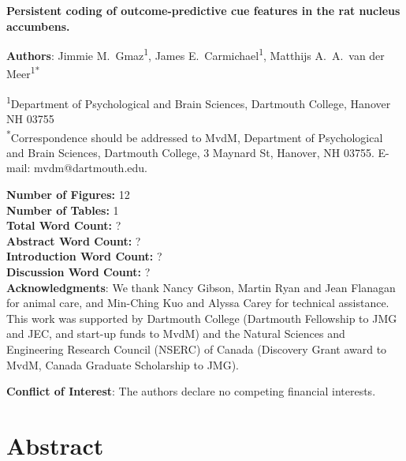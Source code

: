 \documentclass[11pt]{article}
\providecommand{\DIFadd}[1]{{\protect\color{blue}\uwave{#1}}} %
\providecommand{\DIFaddbegin}{} %
\providecommand{\DIFaddend}{} %
\newcommand{\DIFaddincludegraphics}[2][]{{\color{blue}\fbox{\DIFOincludegraphics[#1]{#2}}}} %
\DeclareRobustCommand{\DIFaddbegin}{\DIFOaddbegin \let\includegraphics\DIFaddincludegraphics} %
\DeclareRobustCommand{\DIFaddend}{\DIFOaddend \let\includegraphics\DIFOincludegraphics} %
\begin{document}
{\Large\bf Persistent coding of outcome-predictive cue features in the
  rat nucleus accumbens.}

{\bf Authors}: Jimmie M.\ Gmaz\textsuperscript{1}, James
E.\ Carmichael\textsuperscript{1}, Matthijs A.\ A.\ van der
Meer\textsuperscript{1*}

\textsuperscript{1}Department of Psychological and Brain Sciences,
Dartmouth College, Hanover NH
03755\\ 

\textsuperscript{*}Correspondence should be addressed to MvdM,
Department of Psychological and Brain Sciences, Dartmouth College, 3
Maynard St, Hanover, NH 03755. E-mail: {\sffamily mvdm@dartmouth.edu}.

\textbf{Number of Figures:} 12\\
\textbf{Number of Tables:} 1\\
\textbf{Total Word Count:} ?\\
\textbf{Abstract Word Count:} ?\\
\textbf{Introduction Word Count:} ?\\
\textbf{Discussion Word Count:} ?\\

\textbf{Acknowledgments}: We thank Nancy Gibson, Martin Ryan and Jean
Flanagan for animal care, and Min-Ching Kuo and
Alyssa Carey for technical assistance. This work was supported by
Dartmouth College (Dartmouth Fellowship to JMG and JEC, and start-up funds to
MvdM) and the Natural Sciences and Engineering Research Council
(NSERC) of Canada (Discovery Grant award to MvdM, Canada Graduate
Scholarship to JMG).

\textbf{Conflict of Interest}: The authors declare no competing
financial interests.\\

\newpage
\linenumbers

\section*{Abstract \DIFaddbegin \DIFadd{(eLife: 150 words)}\DIFaddend }
\end{document}
